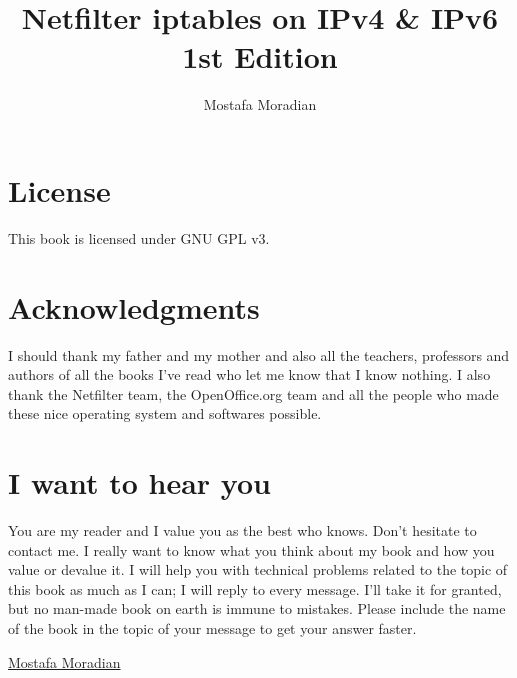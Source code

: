 \documentclass[10pt]{book}
\author{Mostafa Moradian}
\title{Netfilter iptables on IPv4 \& IPv6 \newline 1st Edition}
\begin{document}
\maketitle
\tableofcontents
\newpage
\chapter{License}
This book is licensed under GNU GPL v3.\newpage

\chapter{Acknowledgments}
I should thank my father and my mother and also all the teachers, professors and authors of all the books I've read who let me know that I know nothing. I also thank the Netfilter team, the OpenOffice.org team and all the people who made these nice operating system and softwares possible.\newpage

\chapter{I want to hear you}
You are my reader and I value you as the best who knows. Don't hesitate to contact me. I really want to know what you think about my book and how you value or devalue it. I will help you with technical problems related to the topic of this book as much as I can; I will reply to every message. I'll take it for granted, but no man-made book on earth is immune to mistakes. Please include the name of the book in the topic of your message to get your answer faster. \newline

\href{mailto:iiemanager@gmail.com}{Mostafa Moradian}
\newpage



\end{document}
